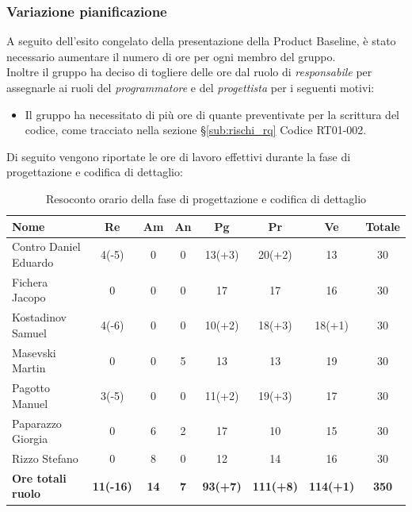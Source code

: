 \documentclass[../piano_di_progetto.tex]{subfiles}
\begin{document}
\subsubsection{Variazione pianificazione}
A seguito dell'esito congelato della presentazione della Product Baseline, è stato necessario aumentare il numero di ore per ogni membro del gruppo.\\
Inoltre il gruppo ha deciso di togliere delle ore dal ruolo di \emph{responsabile} per assegnarle ai ruoli del \emph{programmatore} e del \emph{progettista} per i seguenti motivi:
\begin{itemize}
	\item Il gruppo ha necessitato di più ore di quante preventivate per la scrittura del codice, come tracciato nella sezione \S\ref{sub:rischi_rq} Codice RT01-002. %
\end{itemize}

\noindent Di seguito vengono riportate le ore di lavoro effettivi durante la fase di progettazione e codifica di dettaglio: \\
\begin{table}[!ht]
	\centering
	\begin{tabular}{|l|c|c|c|c|c|c|c|}
	\hline
	\rowcolor{lightgray}
	\textbf{Nome} & \textbf{Re} & \textbf{Am} & \textbf{An} & \textbf{Pg}  & \textbf{Pr}   & \textbf{Ve} & \textbf{Totale}\\
	\hline
	Contro Daniel Eduardo & 4(-5) & 0 & 0 & 13(+3) & 20(+2) & 13 & 30 \\
	Fichera Jacopo & 0 & 0 & 0 & 17 & 17 & 16 & 30 \\
	Kostadinov Samuel & 4(-6) & 0 & 0 & 10(+2) & 18(+3) & 18(+1) & 30 \\			
	Masevski Martin & 0 & 0 & 5 & 13 & 13 & 19 & 30 \\
	Pagotto Manuel & 3(-5) & 0 & 0 & 11(+2) & 19(+3) & 17 & 30 \\			
	Paparazzo Giorgia & 0 & 6 & 2 & 17 & 10 & 15 & 30 \\
	Rizzo Stefano & 0 & 8 & 0 & 12 & 14 & 16 & 30 \\
	\hline
	\textbf{Ore totali ruolo} & \textbf{11(-16)} & \textbf{14} & \textbf{7} & \textbf{93(+7)} & \textbf{111(+8)} & \textbf{114(+1)} & \textbf{350} \\
	\hline
	\end{tabular}
	\caption{Resoconto orario della fase di progettazione e codifica di dettaglio}
\end{table}
\end{document}
